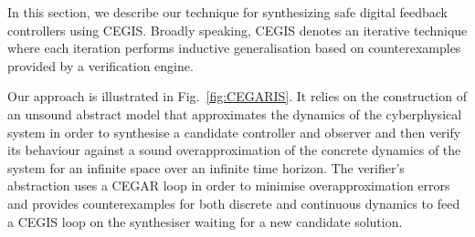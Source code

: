 \documentclass[sigconf]{llncs}
\begin{document}
In this section, we describe our technique for synthesizing safe
digital feedback controllers using CEGIS. Broadly speaking, CEGIS
denotes an iterative technique where each iteration performs inductive
generalisation based on counterexamples provided by a verification
engine.





Our approach is illustrated in Fig.~\ref{fig:CEGARIS}. It relies on the
construction of an unsound abstract model that approximates the dynamics
of the cyberphysical system in order to synthesise a candidate controller
and observer and then verify its behaviour against a sound overapproximation
of the concrete dynamics of the system for an infinite space over an infinite
time horizon.
The verifier's abstraction uses a CEGAR loop in order to minimise 
overapproximation errors and provides counterexamples for both
discrete and continuous dynamics to feed a CEGIS loop on the synthesiser
waiting for a new candidate solution. 
\end{document}
